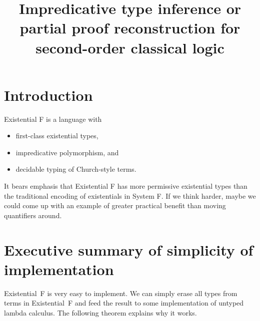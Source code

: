 \documentclass{amsart}
\title
[Impredicative type inference]
{
Impredicative type inference
\break
or
\break
partial proof reconstruction \break
for second-order classical logic
}
\begin{document}
\newcommand{\nc}{\newcommand}
\newcommand{\DotExpr}[2]{#1 #2.\ }
\nc\Abs    {\DotExpr\lambda}
\nc\All    {\DotExpr\forall}
\nc\Allin  {\forall\mathrm{in}}
\nc\Allex  {\forall\mathrm{ex}}
\nc\Abort  {\mathrm{abort}}
\nc\AbortCC{\mathrm{abort/cc}}
\nc\ApplyCC{\mathrm{apply/cc}}
\def\Box   {\mathrm{box}}
\nc\Brouwer{\operatorname{Brouwer}}
\nc\Case   {}
\nc\Cps    {\operatorname{cps}}
\nc\Dn[1]  {(#1 \R \bot) \R \bot}
\nc\Dni    {\mathrm{\neg\neg I}}
\nc\Erase  {\mathrm{erase}}
\nc\Ex     {\DotExpr\exists}
\nc\Exin   {\exists\mathrm{in}}
\nc\Exex   {\exists\mathrm{ex}}
\nc\FV     {\operatorname{FV}}
\nc\Id     {\mathit{id}}
\nc\Indent {\hspace{3em}}
\nc\Mgsr   {\operatorname{mgsr}}
\nc\Or     {\ | \ }
\nc\Prune  {\operatorname{prune}}
\nc\Recall {\DotExpr\Xi} %
\nc\Redo   {\operatorname{redo}}
\nc\Tabs   {\DotExpr\Lambda}
\nc\R      {\rightarrow}
\nc\Unbox  {\mathrm{unbox}}
\nc\Undo   {\operatorname{undo}}
\nc\Unify  {\operatorname{unify}}
\maketitle
\tableofcontents

\section{Introduction}

Existential F is a language with
\begin{itemize}
\item first-class existential types,
\item impredicative polymorphism, and
\item decidable typing of Church-style terms.
\end{itemize}
It bears emphasis that Existential F has more permissive
existential types than the traditional encoding of existentials
in System F. If we think harder, maybe we could come up with an
example of greater practical benefit than moving quantifiers
around.

\section{Executive summary of simplicity of implementation}
\label{sec:exe}

Existential~F is very easy to implement. We can simply erase all
types from terms in Existential~F and feed the result to some
implementation of untyped lambda calculus. The following theorem
explains why it works.
\end{document}
